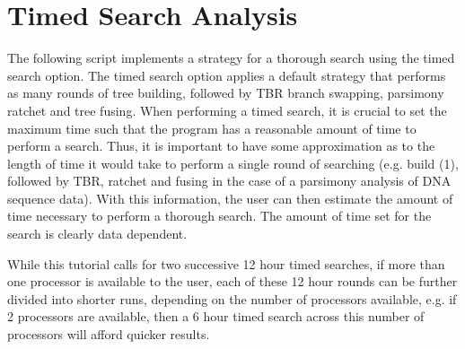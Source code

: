 
\section {Timed Search Analysis}{\label {tutorial2}}

The following script implements a strategy for a thorough search using the timed search option.
The timed search option applies a default strategy that performs as many rounds of tree building, 
followed by TBR branch swapping, parsimony ratchet and tree fusing. When performing a timed 
search, it is crucial to set the maximum time such that the program has a reasonable amount of 
time to perform a search.  Thus, it is important to have some approximation as to the length of 
time it would take to perform a single round of searching (e.g. build (1), followed by TBR, 
ratchet and fusing in the case of a parsimony analysis of DNA sequence data).  With this information, 
the user can then estimate the amount of time necessary to perform a thorough search. The amount 
of time set for the search is clearly data dependent. 

While this tutorial calls 
for two successive 12 hour timed searches, if more than one processor is available to the user, each 
of these 12 hour rounds can be further divided into shorter runs, depending on the number of processors
available, e.g. if 2 processors are available, then a 6 hour timed search across this number of processors
will afford quicker results.

